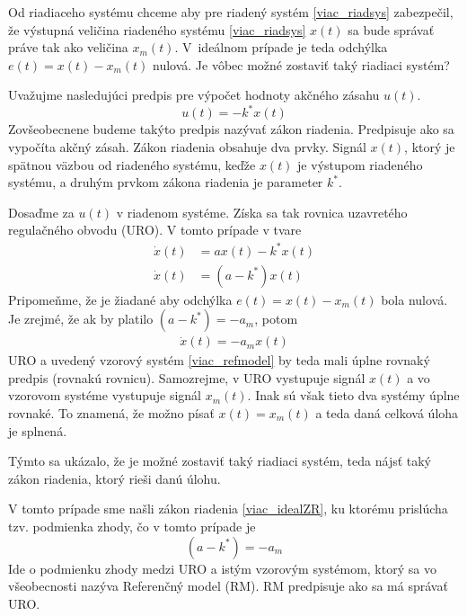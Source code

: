 \documentclass[a4paper, 10pt, ]{article}
\begin{document}
Od riadiaceho systému chceme aby pre riadený systém \eqref{viac_riadsys} zabezpečil, že výstupná veličina riadeného systému \eqref{viac_riadsys} $x(t)$ sa bude správať práve tak ako veličina $x_m(t)$. V~ideálnom prípade je teda odchýlka $e(t) = x(t) - x_m(t)$ nulová. Je vôbec možné zostaviť taký riadiaci systém?

Uvažujme nasledujúci predpis pre výpočet hodnoty akčného zásahu $u(t)$.
\begin{equation} \label{viac_idealZR}
	u(t) = -k^* x(t)
\end{equation}
Zovšeobecnene budeme takýto predpis nazývať zákon riadenia. Predpisuje ako sa vypočíta akčný zásah. Zákon riadenia obsahuje dva prvky. Signál $x(t)$, ktorý je spätnou väzbou od riadeného systému, keďže $x(t)$ je výstupom riadeného systému, a druhým prvkom zákona riadenia je parameter $k^*$.


Dosaďme za $u(t)$ v riadenom systéme. Získa sa tak rovnica uzavretého regulačného obvodu (URO). V tomto prípade v tvare
\begin{subequations}
	\begin{align}
		\dot x(t) &= a x(t) - k^* x(t) \\
		\dot x(t) &= \left( a - k^* \right) x(t)
	\end{align}
\end{subequations}
Pripomeňme, že je žiadané aby odchýlka $e(t) = x(t) - x_m(t)$ bola nulová. Je zrejmé, že ak by platilo $\left( a - k^* \right) = -a_m$, potom
\begin{align}
	\dot x(t) = -a_m x(t)
\end{align}
URO a uvedený vzorový systém \eqref{viac_refmodel} by teda mali úplne rovnaký predpis (rovnakú rovnicu). Samozrejme, v URO vystupuje signál $x(t)$ a vo vzorovom systéme vystupuje signál $x_m(t)$. Inak sú však tieto dva systémy úplne rovnaké. To znamená, že možno písať $x(t) = x_m(t)$ a teda daná celková úloha je splnená.

Týmto sa ukázalo, že je možné zostaviť taký riadiaci systém, teda nájsť taký zákon riadenia, ktorý rieši danú úlohu.

V tomto prípade sme našli zákon riadenia \eqref{viac_idealZR}, ku ktorému prislúcha tzv. podmienka zhody, čo v tomto prípade je
\begin{equation}
	\left( a - k^* \right) = -a_m
\end{equation}
Ide o podmienku zhody medzi URO a istým vzorovým systémom, ktorý sa vo všeobecnosti nazýva Referenčný model (RM). RM predpisuje ako sa má správať URO.
\end{document}
